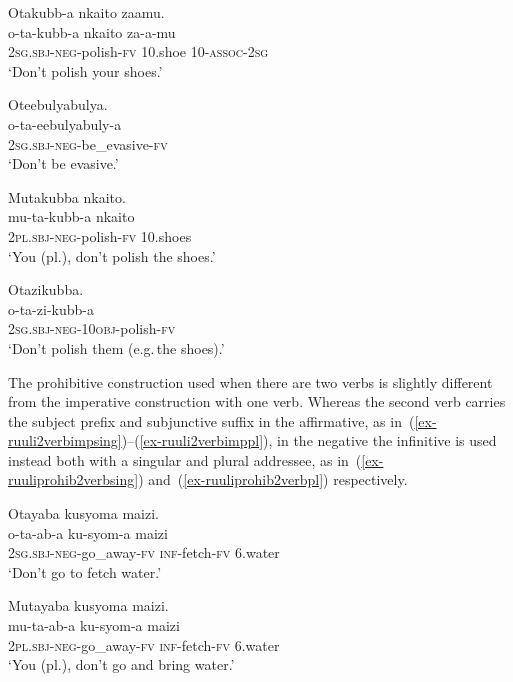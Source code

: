 \ea \begin{xlist}
\ex	\label{ex-ruuliprohibnormal}
	\glll	Otakubb-a nkaito zaamu.\\
		 o-ta-kubb-a nkaito za-a-mu\\
		2\textsc{sg.sbj}-\textsc{neg}-polish-\textsc{fv} 10.shoe 10-\textsc{assoc}-2\textsc{sg}\\
	\glt ‘Don't polish your shoes.’ 

\ex 	\label{ex-ruuliprohibrefl}
	\glll  Oteebulyabulya.\\
		o-ta-eebulyabuly-a\\
		2\textsc{sg.sbj}-\textsc{neg}-be\_evasive-\textsc{fv}\\
	\glt ‘Don't be evasive.’ 

\ex 	\label{ex-ruuliprohib2pl}
	\glll Mutakubba nkaito.\\
		mu-ta-kubb-a nkaito\\
		2\textsc{pl.sbj}-\textsc{neg}-polish-\textsc{fv} 10.shoes\\
	\glt ‘You (pl.), don't polish the shoes.’ 

\ex 	\label{ex-ruuliprohibobj}
	\glll Otazikubba.\\
		o-ta-zi-kubb-a\\
		2\textsc{sg.sbj}-\textsc{neg}-\textsc{10obj}-polish-\textsc{fv}\\
	\glt ‘Don't polish them (e.g.\,the shoes).’ 	
\end{xlist}
\z

The prohibitive construction used when there are two verbs is slightly different from the imperative construction with one verb. 
Whereas the second verb carries the subject prefix and subjunctive suffix in the affirmative, as in~(\ref{ex-ruuli2verbimpsing})--(\ref{ex-ruuli2verbimppl}), in the negative the infinitive is used instead both with a singular and plural addressee, as in~(\ref{ex-ruuliprohib2verbsing}) and~(\ref{ex-ruuliprohib2verbpl}) respectively. 

\ea \label{ex-ruuliprohib2verb}
\begin{xlist}
	\ex \label{ex-ruuliprohib2verbsing}
	\glll  Otayaba kusyoma maizi.\\
		o-ta-ab-a ku-syom-a maizi\\
		2\textsc{sg.sbj}-\textsc{neg}-go\_away-\textsc{fv} \textsc{inf}-fetch-\textsc{fv} 6.water\\
\glt ‘Don't go to fetch water.’ 

	\ex \label{ex-ruuliprohib2verbpl}
	\glll	Mutayaba kusyoma maizi.\\
		mu-ta-ab-a ku-syom-a maizi\\
		2\textsc{pl.sbj}-\textsc{neg}-go\_away-\textsc{fv} \textsc{inf}-fetch-\textsc{fv} 6.water\\
\glt ‘You (pl.), don't go and bring water.’ 
\end{xlist}
\z

